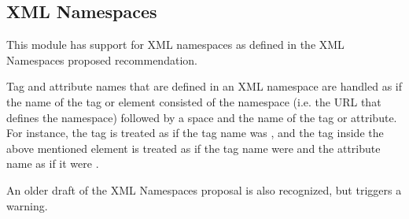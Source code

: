\subsection{XML Namespaces \label{xml-namespace}}

This module has support for XML namespaces as defined in the XML
Namespaces proposed recommendation.

Tag and attribute names that are defined in an XML namespace are
handled as if the name of the tag or element consisted of the
namespace (i.e. the URL that defines the namespace) followed by a
space and the name of the tag or attribute.  For instance, the tag
 is treated as if 
the tag name was , and
the tag  inside the above
mentioned element is treated as if the tag name were
 and the attribute name as
if it were .

An older draft of the XML Namespaces proposal is also recognized, but
triggers a warning.

\begin{seealso}
\end{seealso}
